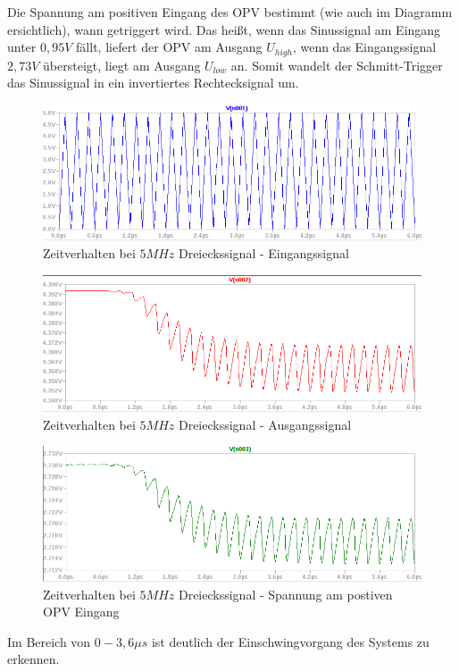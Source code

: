 \documentclass[12pt,a4paper,titlepage]{article}
\begin{document}
\noindent Die Spannung am positiven Eingang des OPV bestimmt (wie auch im Diagramm ersichtlich), wann getriggert wird. Das heißt, wenn das Sinussignal am Eingang unter $0,95V$ f\"allt, liefert der OPV am Ausgang $U_{high}$, wenn das Eingangssignal $2,73V$ \"ubersteigt, liegt am Ausgang $U_{low}$ an. Somit wandelt der Schmitt-Trigger das Sinussignal in ein invertiertes Rechtecksignal um.

\begin{figure}[H]
  \centering
  \includegraphics[width=150mm]{schmitt_transient3.png}
  \caption{Zeitverhalten bei $5MHz$ Dreieckssignal - Eingangssignal}
\end{figure}

\begin{figure}[H]
  \centering
  \includegraphics[width=150mm]{schmitt_transient4.png}
  \caption{Zeitverhalten bei $5MHz$ Dreieckssignal - Ausgangssignal}
\end{figure}

\begin{figure}[H]
  \centering
  \includegraphics[width=150mm]{schmitt_transient5.png}
  \caption{Zeitverhalten bei $5MHz$ Dreieckssignal - Spannung am postiven OPV Eingang}
\end{figure}

\noindent Im Bereich von $0-3,6\mu s$ ist deutlich der Einschwingvorgang des Systems zu erkennen.
\end{document}
